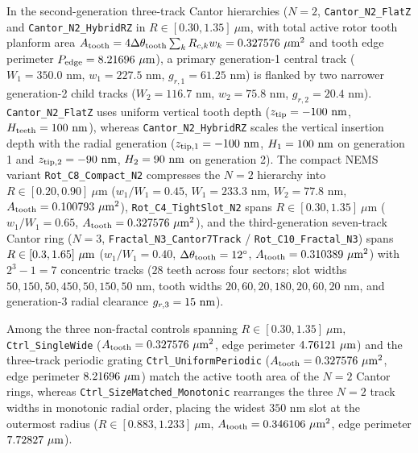 \documentclass[pdflatex,sn-nature]{sn-jnl}
\begin{document}
In the second-generation three-track Cantor hierarchies ($N=2$, \texttt{Cantor\_N2\_FlatZ} and \texttt{Cantor\_N2\_HybridRZ} in $R \in [0.30, 1.35]\ \mu\text{m}$, with total active rotor tooth planform area $A_{\rm tooth} = 4\Delta\theta_{\rm tooth}\sum_k R_{c,k} w_k = \FractalCantorFlatzActiveToothAreaUmtwo{}\ \mu\text{m}^2$ and tooth edge perimeter $P_{\rm edge} = 8.21696{}\ \mu\text{m}$), a primary generation-1 central track ($W_1 = 350.0\text{ nm}$, $w_1 = 227.5\text{ nm}$, $g_{r,1} = 61.25\text{ nm}$) is flanked by two narrower generation-2 child tracks ($W_2 = 116.7\text{ nm}$, $w_2 = 75.8\text{ nm}$, $g_{r,2} = 20.4\text{ nm}$). \texttt{Cantor\_N2\_FlatZ} uses uniform vertical tooth depth ($z_{\rm tip} = -100\text{ nm}$, $H_{\rm teeth} = 100\text{ nm}$), whereas \texttt{Cantor\_N2\_HybridRZ} scales the vertical insertion depth with the radial generation ($z_{\rm tip,1} = -100{}\text{ nm}$, $H_1 = 100{}\text{ nm}$ on generation 1 and $z_{\rm tip,2} = -90{}\text{ nm}$, $H_2 = 90{}\text{ nm}$ on generation 2). The compact NEMS variant \texttt{Rot\_C8\_Compact\_N2} compresses the $N=2$ hierarchy into $R \in [0.20, 0.90]\ \mu\text{m}$ ($w_1/W_1 = 0.45$, $W_1 = 233.3\text{ nm}$, $W_2 = 77.8\text{ nm}$, $A_{\rm tooth} = \RotCeightCompactNtwoStandardThetaZerofoureightpzeroPolarOverlapUmtwo{}\ \mu\text{m}^2$), \texttt{Rot\_C4\_TightSlot\_N2} spans $R \in [0.30, 1.35]\ \mu\text{m}$ ($w_1/W_1 = 0.65$, $A_{\rm tooth} = \RotCfourTightslotNtwoHighThetaZerofoureightpzeroPolarOverlapUmtwo{}\ \mu\text{m}^2$), and the third-generation seven-track Cantor ring ($N=3$, \texttt{Fractal\_N3\_Cantor7Track} / \texttt{Rot\_C10\_Fractal\_N3}) spans $R \in [0.3{}, 1.65{}]\ \mu\text{m}$ ($w_1/W_1 = 0.40$, $\Delta\theta_{\rm tooth} = 12^\circ$, $A_{\rm tooth} = \RotConezeroFractalNthreeStandardThetaZerofoureightpzeroPolarOverlapUmtwo{}\ \mu\text{m}^2$) with $2^3 - 1 = 7$ concentric tracks ($28$ teeth across four sectors; slot widths $50, 150, 50, 450, 50, 150, 50\text{ nm}$, tooth widths $20, 60, 20, 180, 20, 60, 20\text{ nm}$, and generation-3 radial clearance $g_{r,3} = 15{}\text{ nm}$).

Among the three non-fractal controls spanning $R \in [0.30, 1.35]\ \mu\text{m}$, \texttt{Ctrl\_SingleWide} ($A_{\rm tooth} = 0.327576{}\ \mu\text{m}^2$, edge perimeter $\FractalCtrlSinglewideEdgePerimeterUm{}\ \mu\text{m}$) and the three-track periodic grating \texttt{Ctrl\_UniformPeriodic} ($A_{\rm tooth} = \FractalCtrlUniformperiodicActiveToothAreaUmtwo{}\ \mu\text{m}^2$, edge perimeter $\FractalCtrlUniformperiodicEdgePerimeterUm{}\ \mu\text{m}$) match the active tooth area of the $N=2$ Cantor rings, whereas \texttt{Ctrl\_SizeMatched\_Monotonic} rearranges the three $N=2$ track widths in monotonic radial order, placing the widest $350\text{ nm}$ slot at the outermost radius ($R \in [0.883, 1.233]\ \mu\text{m}$, $A_{\rm tooth} = \FractalCtrlSizematchedMonotonicActiveToothAreaUmtwo{}\ \mu\text{m}^2$, edge perimeter $\FractalCtrlSizematchedMonotonicEdgePerimeterUm{}\ \mu\text{m}$).
\end{document}
